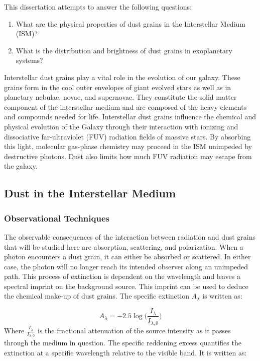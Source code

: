\documentclass[oneside]{book}
\theoremstyle{definition}
\numberwithin{equation}{section}
\begin{document}
This dissertation attempts to answer the following questions:

\begin{enumerate}
\item What are the physical properties of dust grains in the Interstellar Medium (ISM)?
\item What is the distribution and brightness of dust grains in exoplanetary systems?
\end{enumerate}

Interstellar dust grains play a vital role in the evolution of our galaxy. These grains form in the cool outer envelopes of giant evolved stars as well as in planetary nebulae, novae, and supernovae. They constitute the solid matter component of the interstellar medium and are composed of the heavy elements and compounds needed for life. Interstellar dust grains influence the chemical and physical evolution of the Galaxy through their interaction with ionizing and dissociative far-ultraviolet (FUV) radiation fields of massive stars. By absorbing this light, molecular gas-phase chemistry may proceed in the ISM unimpeded by destructive photons. Dust also limits how much FUV radiation may escape from the galaxy. 

\subsection{Dust in the Interstellar Medium}

\subsubsection{Observational Techniques}

The observable consequences of the interaction between radiation and dust grains that will be studied here are absorption, scattering, and polarization. When a photon encounters a dust grain, it can either be absorbed or scattered. In either case, the photon will no longer reach its intended observer along an unimpeded path. This process of extinction is dependent on the wavelength and leaves a spectral imprint on the background source. This imprint can be used to deduce the chemical make-up of dust grains. The specific extinction $A_{\lambda}$ is written as:

\begin{equation}
A_{\lambda} = -2.5\log\big(\frac{I_{\lambda}}{I_{\lambda,0}}\big)
\end{equation}
Where $\frac{I_{\lambda}}{I_{\lambda,0}}$ is the fractional attenuation of the source intensity as it passes through the medium in question. The specific reddening excess quantifies the extinction at a specific wavelength relative to the visible band. It is written as:
\end{document}
